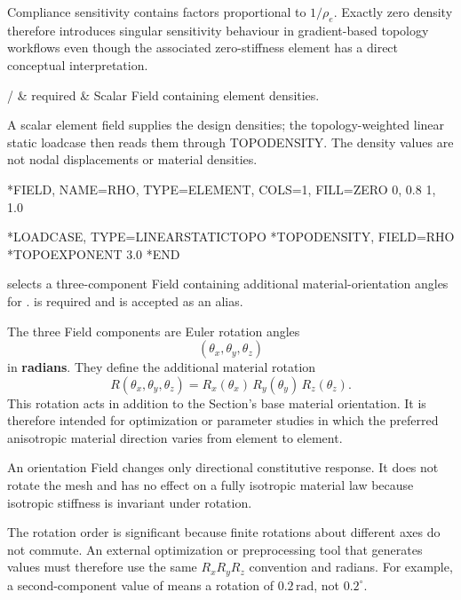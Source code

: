 Compliance sensitivity contains factors proportional to \(1/\rho_e\). Exactly zero density therefore introduces singular sensitivity behaviour in gradient-based topology workflows even though the associated zero-stiffness element has a direct conceptual interpretation.

\begin{keywordparameters}
 /  & required & Scalar  Field containing element densities. \\
\end{keywordparameters}

A scalar element field supplies the design densities; the topology-weighted linear static loadcase then reads them through TOPODENSITY. The density values are not nodal displacements or material densities.

\exampleheading
\begin{inputdeck}
*FIELD, NAME=RHO, TYPE=ELEMENT,
 COLS=1, FILL=ZERO
0, 0.8
1, 1.0

*LOADCASE, TYPE=LINEARSTATICTOPO
*TOPODENSITY, FIELD=RHO
*TOPOEXPONENT
3.0
*END
\end{inputdeck}


 selects a three-component  Field containing additional material-orientation angles for .  is required and  is accepted as an alias.

The three Field components are Euler rotation angles
\[
(\theta_x,\theta_y,\theta_z)
\]
in \textbf{radians}. They define the additional material rotation
\[
R(\theta_x,\theta_y,\theta_z)
=R_x(\theta_x)\,R_y(\theta_y)\,R_z(\theta_z).
\]
This rotation acts in addition to the Section's base material orientation. It is therefore intended for optimization or parameter studies in which the preferred anisotropic material direction varies from element to element.

An orientation Field changes only directional constitutive response. It does not rotate the mesh and has no effect on a fully isotropic material law because isotropic stiffness is invariant under rotation.

The rotation order is significant because finite rotations about different axes do not commute. An external optimization or preprocessing tool that generates  values must therefore use the same \(R_xR_yR_z\) convention and radians. For example, a second-component value of  means a rotation of \(0.2\,\mathrm{rad}\), not \(0.2^\circ\).

